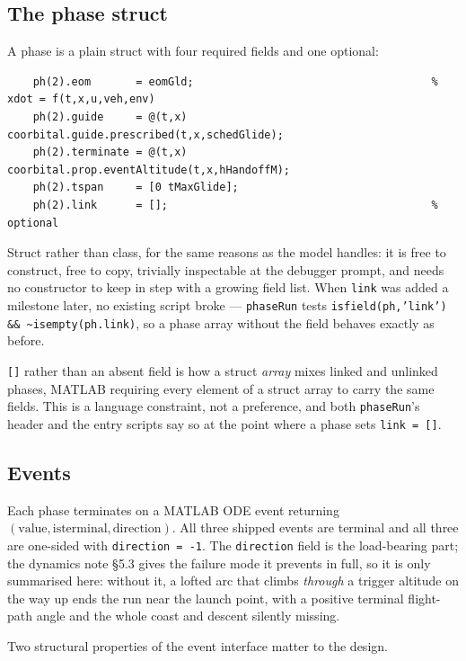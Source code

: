 \documentclass[11pt]{article}
\newcommand{\code}[1]{\texttt{#1}}
\begin{document}
\subsection{The phase struct}

A phase is a plain struct with four required fields and one optional:

\begin{lstlisting}
    ph(2).eom       = eomGld;                                     % xdot = f(t,x,u,veh,env)
    ph(2).guide     = @(t,x) coorbital.guide.prescribed(t,x,schedGlide);
    ph(2).terminate = @(t,x) coorbital.prop.eventAltitude(t,x,hHandoffM);
    ph(2).tspan     = [0 tMaxGlide];
    ph(2).link      = [];                                         % optional
\end{lstlisting}

Struct rather than class, for the same reasons as the model handles: it is
free to construct, free to copy, trivially inspectable at the debugger prompt,
and needs no constructor to keep in step with a growing field list. When
\code{link} was added a milestone later, no existing script broke ---
\code{phaseRun} tests \code{isfield(ph,'link') \&\& \textasciitilde isempty(ph.link)},
so a phase array without the field behaves exactly as before.

\code{[]} rather than an absent field is how a struct \emph{array} mixes linked
and unlinked phases, MATLAB requiring every element of a struct array to carry
the same fields. This is a language constraint, not a preference, and both
\code{phaseRun}'s header and the entry scripts say so at the point where a
phase sets \code{link = []}.

\subsection{Events}

Each phase terminates on a MATLAB ODE event returning
$(\text{value},\text{isterminal},\text{direction})$. All three shipped events
are terminal and all three are one-sided with \code{direction = -1}. The
\code{direction} field is the load-bearing part; the dynamics note \S5.3 gives
the failure mode it prevents in full, so it is only summarised here: without
it, a lofted arc that climbs \emph{through} a trigger altitude on the way up
ends the run near the launch point, with a positive terminal flight-path angle
and the whole coast and descent silently missing.

Two structural properties of the event interface matter to the design.
\end{document}
